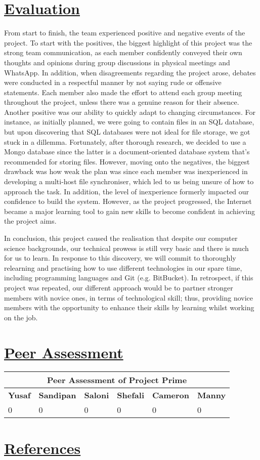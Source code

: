 \documentclass{article}
\begin{document}
\section{\underline{Evaluation}}
From start to finish, the team experienced  positive and negative events of the project. To start with the positives, the biggest highlight of this project was the strong team communication, as each member confidently conveyed their own thoughts and opinions during group discussions in physical meetings and WhatsApp. In addition, when disagreements regarding the project arose, debates were conducted in a respectful manner by not saying rude or offensive statements. Each member also made the effort to attend each group meeting throughout the project, unless there was a genuine reason for their absence. Another positive was our ability to quickly adapt to changing circumstances. For instance, as initially planned, we were going to contain files in an SQL database, but upon discovering that SQL databases were not ideal for file storage, we got stuck in a dillemma. Fortunately, after thorough research, we decided to use a Mongo database since the latter is a document-oriented database system that's recommended for storing files. However, moving onto the negatives, the biggest drawback was how weak the plan was since each member was inexperienced in developing a multi-host file synchroniser, which led to us being unsure of how to approach the task. In addition, the level of inexperience formerly impacted our confidence to build the system. However, as the project progressed, the Internet became a major learning tool to gain new skills to become confident in achieving the project aims.

In conclusion, this project caused the realisation that despite our computer science backgrounds, our technical prowess is still very basic and there is much for us to learn. In response to this discovery, we will commit to thoroughly relearning and practising how to use different technologies in our spare time, including programming languages and Git (e.g. BitBucket). In retrospect, if this project was repeated, our different approach would be to partner stronger members with novice ones, in terms of technological skill; thus, providing novice members with the opportunity to enhance their skills by learning whilst working on the job.   

\section{\underline{Peer Assessment}}
\begin{tabular}{|p{2cm}|p{2cm}|p{2cm}|p{2cm}|p{2cm}|p{2cm}|}
\hline
\multicolumn{6}{|c|}{\textbf{Peer Assessment of Project Prime}} \\
\hline
\textbf{Yusaf} & \textbf{Sandipan} & \textbf{Saloni} & \textbf{Shefali} & \textbf{Cameron} & \textbf{Manny} \\
\hline
0 & 0 & 0 & 0 & 0 & 0 \\
\hline
\end{tabular}
	
\section{\underline{References}}
\end{document}
